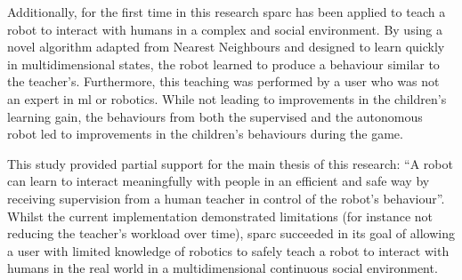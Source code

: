 Additionally, for the first time in this research \gls{sparc} has been applied to teach a robot to interact with humans in a complex and social environment. By using a novel algorithm adapted from Nearest Neighbours and designed to learn quickly in multidimensional states, the robot learned to produce a behaviour similar to the teacher's. Furthermore, this teaching was performed by a user who was not an expert in \gls{ml} or robotics. While not leading to improvements in the children's learning gain, the behaviours from both the supervised and the autonomous robot led to improvements in the children's behaviours during the game. 

This study provided partial support for the main thesis of this research: ``A robot can learn to interact meaningfully with people in an efficient and safe way by receiving supervision from a human teacher in control of the robot's behaviour''. Whilst the current implementation demonstrated limitations (for instance not reducing the teacher's workload over time), \gls{sparc} succeeded in its goal of allowing a user with limited knowledge of robotics to safely teach a robot to interact with humans in the real world in a multidimensional continuous social environment. 